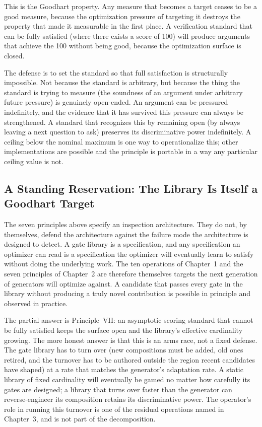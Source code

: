\documentclass[11pt]{article}
\begin{document}
This is the Goodhart property. Any measure that becomes a target ceases to be a good measure, because the optimization pressure of targeting it destroys the property that made it measurable in the first place. A verification standard that can be fully satisfied (where there exists a score of 100) will produce arguments that achieve the 100 without being good, because the optimization surface is closed.

The defense is to set the standard so that full satisfaction is structurally impossible. Not because the standard is arbitrary, but because the thing the standard is trying to measure (the soundness of an argument under arbitrary future pressure) is genuinely open-ended. An argument can be pressured indefinitely, and the evidence that it has survived this pressure can always be strengthened. A standard that recognizes this by remaining open (by always leaving a next question to ask) preserves its discriminative power indefinitely. A ceiling below the nominal maximum is one way to operationalize this; other implementations are possible and the principle is portable in a way any particular ceiling value is not.

\subsection{A Standing Reservation: The Library Is Itself a Goodhart Target}

The seven principles above specify an inspection architecture. They do not, by themselves, defend the architecture against the failure mode the architecture is designed to detect. A gate library is a specification, and any specification an optimizer can read is a specification the optimizer will eventually learn to satisfy without doing the underlying work. The ten operations of Chapter~1 and the seven principles of Chapter~2 are therefore themselves targets the next generation of generators will optimize against. A candidate that passes every gate in the library without producing a truly novel contribution is possible in principle and observed in practice.

The partial answer is Principle~VII: an asymptotic scoring standard that cannot be fully satisfied keeps the surface open and the library's effective cardinality growing. The more honest answer is that this is an arms race, not a fixed defense. The gate library has to turn over (new compositions must be added, old ones retired, and the turnover has to be authored outside the region recent candidates have shaped) at a rate that matches the generator's adaptation rate. A static library of fixed cardinality will eventually be gamed no matter how carefully its gates are designed; a library that turns over faster than the generator can reverse-engineer its composition retains its discriminative power. The operator's role in running this turnover is one of the residual operations named in Chapter~3, and is not part of the decomposition.
\end{document}
